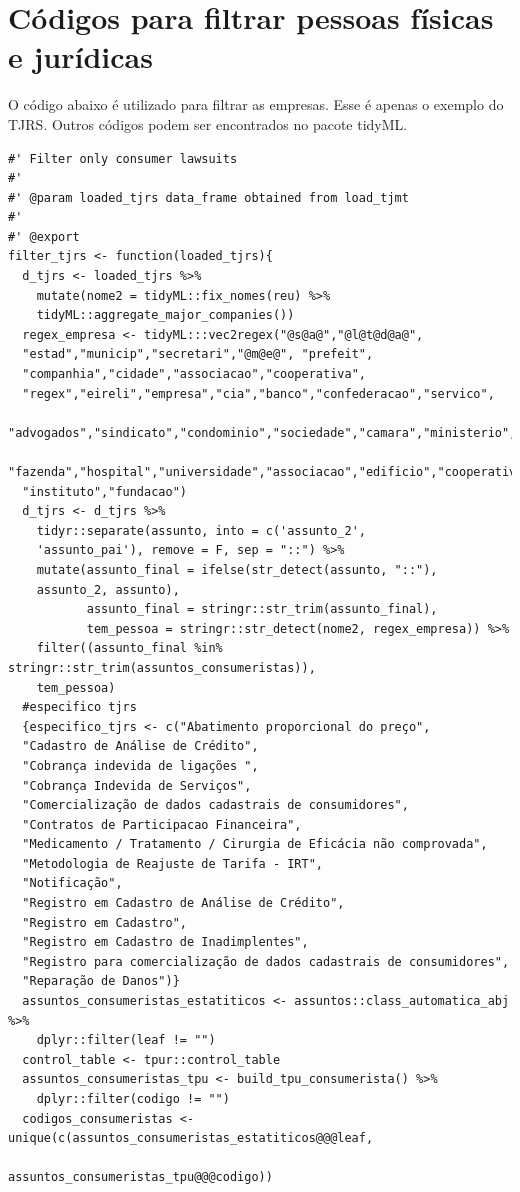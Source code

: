 \documentclass[]{report}
\begin{document}
\chapter{Códigos para filtrar pessoas físicas e
jurídicas}\label{codpfpj}

O código abaixo é utilizado para filtrar as empresas. Esse é apenas o
exemplo do TJRS. Outros códigos podem ser encontrados no pacote tidyML.

\begin{verbatim}
#' Filter only consumer lawsuits
#'
#' @param loaded_tjrs data_frame obtained from load_tjmt
#'
#' @export
filter_tjrs <- function(loaded_tjrs){
  d_tjrs <- loaded_tjrs %>%
    mutate(nome2 = tidyML::fix_nomes(reu) %>%
    tidyML::aggregate_major_companies())
  regex_empresa <- tidyML:::vec2regex("@s@a@","@l@t@d@a@",
  "estad","municip","secretari","@m@e@", "prefeit",
  "companhia","cidade","associacao","cooperativa",
  "regex","eireli","empresa","cia","banco","confederacao","servico",
  "advogados","sindicato","condominio","sociedade","camara","ministerio",
  "fazenda","hospital","universidade","associacao","edificio","cooperativa",
  "instituto","fundacao")
  d_tjrs <- d_tjrs %>%
    tidyr::separate(assunto, into = c('assunto_2',
    'assunto_pai'), remove = F, sep = "::") %>%
    mutate(assunto_final = ifelse(str_detect(assunto, "::"),
    assunto_2, assunto),
           assunto_final = stringr::str_trim(assunto_final),
           tem_pessoa = stringr::str_detect(nome2, regex_empresa)) %>%
    filter((assunto_final %in% stringr::str_trim(assuntos_consumeristas)),
    tem_pessoa)
  #especifico tjrs
  {especifico_tjrs <- c("Abatimento proporcional do preço",
  "Cadastro de Análise de Crédito",
  "Cobrança indevida de ligações ",
  "Cobrança Indevida de Serviços",
  "Comercialização de dados cadastrais de consumidores",
  "Contratos de Participacao Financeira",
  "Medicamento / Tratamento / Cirurgia de Eficácia não comprovada",
  "Metodologia de Reajuste de Tarifa - IRT",
  "Notificação",
  "Registro em Cadastro de Análise de Crédito",
  "Registro em Cadastro",
  "Registro em Cadastro de Inadimplentes",
  "Registro para comercialização de dados cadastrais de consumidores",
  "Reparação de Danos")}
  assuntos_consumeristas_estatiticos <- assuntos::class_automatica_abj %>%
    dplyr::filter(leaf != "")
  control_table <- tpur::control_table
  assuntos_consumeristas_tpu <- build_tpu_consumerista() %>%
    dplyr::filter(codigo != "")
  codigos_consumeristas <- unique(c(assuntos_consumeristas_estatiticos@@@leaf,
                                    assuntos_consumeristas_tpu@@@codigo))

\end{verbatim}
\end{document}
